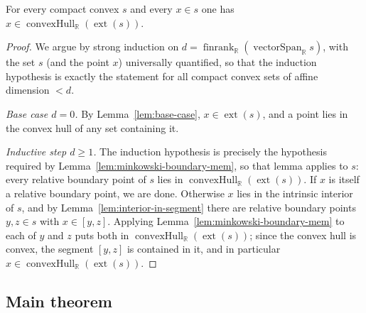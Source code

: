 \begin{lemma}
    \label{lem:minkowski}
    \leanok
    For every compact convex $s$ and every $x \in s$ one has
    $x \in \operatorname{convexHull}_{\mathbb R}(\operatorname{ext}(s))$.
\end{lemma}
\begin{proof}
    We argue by strong induction on
    $d = \operatorname{finrank}_{\mathbb R}(\operatorname{vectorSpan}_{\mathbb R} s)$,
    with the set $s$ (and the point $x$) universally quantified, so that the
    induction hypothesis is exactly the statement for all compact convex sets of
    affine dimension $< d$.

    \emph{Base case $d = 0$.} By Lemma~\ref{lem:base-case},
    $x \in \operatorname{ext}(s)$, and a point lies in the convex hull of any set
    containing it.

    \emph{Inductive step $d \ge 1$.} The induction hypothesis is precisely the
    hypothesis required by Lemma~\ref{lem:minkowski-boundary-mem}, so that lemma
    applies to $s$: every relative boundary point of $s$ lies in
    $\operatorname{convexHull}_{\mathbb R}(\operatorname{ext}(s))$. If $x$ is itself
    a relative boundary point, we are done. Otherwise $x$ lies in the intrinsic
    interior of $s$, and by Lemma~\ref{lem:interior-in-segment} there are relative
    boundary points $y, z \in s$ with $x \in [y, z]$. Applying
    Lemma~\ref{lem:minkowski-boundary-mem} to each of $y$ and $z$ puts both in
    $\operatorname{convexHull}_{\mathbb R}(\operatorname{ext}(s))$; since the convex
    hull is convex, the segment $[y, z]$ is contained in it, and in particular
    $x \in \operatorname{convexHull}_{\mathbb R}(\operatorname{ext}(s))$.
\end{proof}

\subsection{Main theorem}

